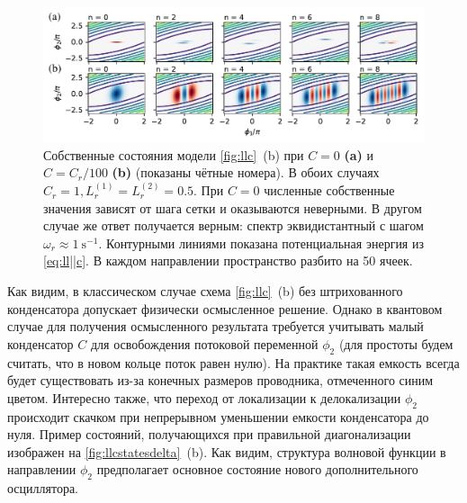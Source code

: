 \documentclass[14pt, a4paper]{extreport}
\numberwithin{equation}{section}
\begin{document}
\begin{figure}
	\includegraphics[width=\linewidth]{Pictures/llc_states}
	\caption{Собственные состояния модели \autoref{fig:llc}~(b) при $C = 0$ \textbf{(a)} и $C = C_r/100$ \textbf{(b)} (показаны чётные номера). В обоих случаях $C_r = 1, L_r^{(1)} = L_r^{(2)} = 0.5$. При $C = 0$ численные собственные значения зависят от шага сетки и оказываются неверными. В другом случае же ответ получается верным: спектр эквидистантный с шагом $\omega_r \approx 1\ \text{s}^{-1}$. Контурными линиями показана потенциальная энергия из \eqref{eq:ll||c}. В каждом направлении пространство разбито на 50 ячеек.}
	\label{fig:llcstatesdelta}
\end{figure}

Как видим, в классическом случае схема \autoref{fig:llc}~(b) без штрихованного конденсатора допускает физически осмысленное решение. Однако в квантовом случае для получения осмысленного результата требуется учитывать малый конденсатор $C$ для освобождения потоковой переменной $\phi_2$ (для простоты будем считать, что в новом кольце поток равен нулю). На практике такая емкость всегда будет существовать из-за конечных размеров проводника, отмеченного синим цветом. Интересно также, что переход от локализации к делокализации $\phi_2$ происходит скачком при непрерывном уменьшении емкости конденсатора до нуля. Пример состояний, получающихся при правильной диагонализации изображен на \autoref{fig:llcstatesdelta}~(b). Как видим, структура волновой функции в направлении $\phi_2$ предполагает основное состояние нового дополнительного осциллятора. 
\end{document}
